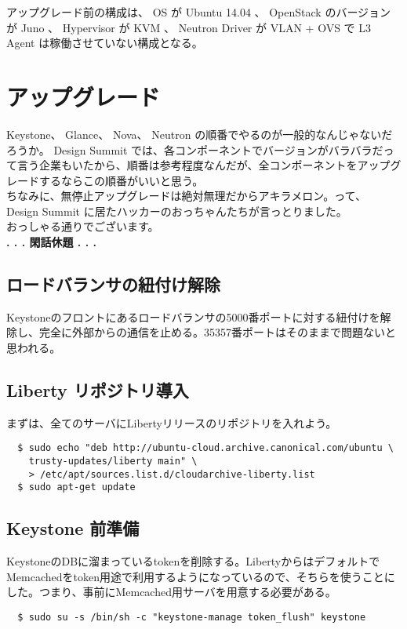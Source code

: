 \documentclass[9pt,b5paper,tombo,openany]{jsbook}
\begin{document}
アップグレード前の構成は、 OS が Ubuntu 14.04 、 OpenStack のバージョンが Juno 、 Hypervisor が KVM 、 Neutron Driver が VLAN + OVS で L3 Agent は稼働させていない構成となる。

\section{アップグレード}
Keystone、 Glance、 Nova、 Neutron の順番でやるのが一般的なんじゃないだろうか。 Design Summit では、各コンポーネントでバージョンがバラバラだって言う企業もいたから、順番は参考程度なんだが、全コンポーネントをアップグレードするならこの順番がいいと思う。\\[1ex]
ちなみに、無停止アップグレードは絶対無理だからアキラメロン。って、 Design Summit に居たハッカーのおっちゃんたちが言っとりました。\\[1ex]

\noindent
おっしゃる通りでございます。\\[1ex]

\noindent
\textbf{. . . 閑話休題 . . .}

\subsection{ロードバランサの紐付け解除}
Keystoneのフロントにあるロードバランサの5000番ポートに対する紐付けを解除し、完全に外部からの通信を止める。35357番ポートはそのままで問題ないと思われる。

\subsection{Liberty リポジトリ導入}
\noindent
まずは、全てのサーバにLibertyリリースのリポジトリを入れよう。

\begin{lstlisting}
  $ sudo echo "deb http://ubuntu-cloud.archive.canonical.com/ubuntu \
    trusty-updates/liberty main" \
    > /etc/apt/sources.list.d/cloudarchive-liberty.list
  $ sudo apt-get update
\end{lstlisting}

\subsection{Keystone 前準備}
KeystoneのDBに溜まっているtokenを削除する。LibertyからはデフォルトでMemcachedをtoken用途で利用するようになっているので、そちらを使うことにした。つまり、事前にMemcached用サーバを用意する必要がある。

\begin{lstlisting}
  $ sudo su -s /bin/sh -c "keystone-manage token_flush" keystone
\end{lstlisting}
\end{document}

